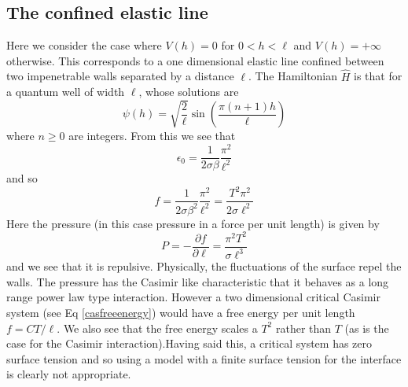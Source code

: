     \subsection{The confined elastic line}
    
Here we consider the case where $V(h)= 0$ for $0\less h \less \ell$ and $V(h)=+\infty$ otherwise. This corresponds to a one dimensional elastic line confined between two impenetrable walls separated by a distance $\ell$. The Hamiltonian $\hat H$ is that for a quantum well of width $\ell$, whose solutions are \cite{claude_cohen-tannoudji_mecanique_2018}
\begin{equation}
    \psi(h) = \sqrt{\frac{2}{\ell}}\sin(\frac{\pi(n+1)h}{\ell})
\end{equation}
where $n\geq 0$ are integers. From this we see that
\begin{equation}
    \epsilon_0 = \frac{1}{2\sigma\beta}\frac{\pi^2}{\ell^2}
\end{equation}
and so
\begin{equation}
    f = \frac{1}{2\sigma\beta^2}\frac{\pi^2}{\ell^2}= \frac{T^2\pi^2}{2\sigma\ell^2}
\end{equation}
Here the pressure (in this case pressure in a force per unit length) is given by
\begin{equation}
    P = -\frac{\partial f}{\partial \ell} = \frac{\pi^2 T^2}{\sigma\ell^3}
    \label{pfree}
\end{equation}
and we see that it is repulsive. Physically, the fluctuations of the surface repel the walls. 
The pressure has the Casimir like characteristic that it behaves as a long range power law type interaction. However a two dimensional critical Casimir system (see Eq \eqref{casfreeenergy}) would have a free energy per unit length $f=CT/\ell$. We also see that the free energy scales  a $T^2$ rather than $T$ (as is the case for the Casimir interaction).Having said this, a critical system has zero surface tension and so using a model with a finite
surface tension for the interface is clearly not appropriate.

